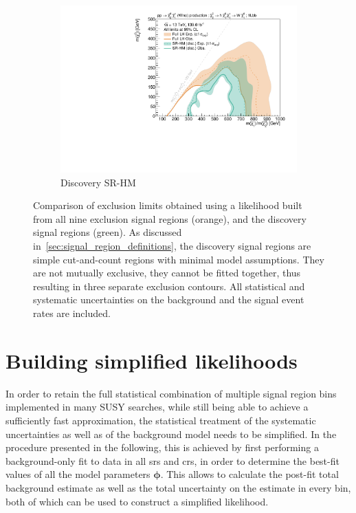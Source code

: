 \begin{figure}
	\begin{subfigure}[b]{0.5\textwidth}
		\centering\includegraphics[width=\textwidth]{exclusion_1Lbb_SRHM_noLabel}
		\caption{Discovery SR-HM\label{fig:single_bin_SRHM}}
	\end{subfigure}%
	\caption{Comparison of exclusion limits obtained using a likelihood built from all nine exclusion signal regions (orange), and the discovery signal regions (green). As discussed in~\cref{sec:signal_region_definitions}, the discovery signal regions are simple cut-and-count regions with minimal model assumptions. They are not mutually exclusive, they cannot be fitted together, thus resulting in three separate exclusion contours. All statistical and systematic uncertainties on the background and the signal event rates are included.}\label{fig:single_bin}
\end{figure}

\section{Building simplified likelihoods}\label{sec:building_simplified_likelihoods}



In order to retain the full statistical combination of multiple signal region bins implemented in many SUSY searches, while still being able to achieve a sufficiently fast approximation, the statistical treatment of the systematic uncertainties as well as of the background model needs to be simplified. In the procedure presented in the following, this is achieved by first performing a background-only fit to data in all \glspl{sr} and \glspl{cr}, in order to determine the best-fit values of all the model parameters $\boldsymbol{\phi}$. This allows to calculate the post-fit total background estimate as well as the total uncertainty on the estimate in every bin, both of which can be used to construct a simplified likelihood.

